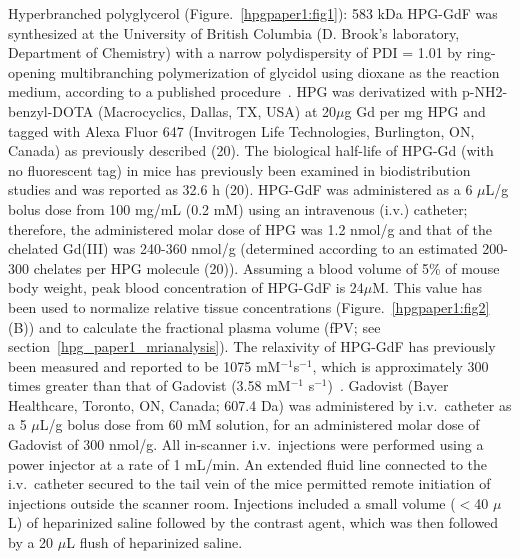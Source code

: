 Hyperbranched polyglycerol (Figure.~\ref{hpgpaper1:fig1}): 583 \acs{kDa} \acs{HPG-GdF} was synthesized at the University of British Columbia (D. Brook's laboratory, Department of Chemistry) with a narrow polydispersity of PDI = 1.01 by ring-opening multibranching polymerization of glycidol using dioxane as the reaction medium, according to a published procedure~\cite{Kainthan:2006ce}.
HPG was derivatized with p-NH2-benzyl-DOTA (Macrocyclics, Dallas, TX, USA) at 20$\mu$g Gd per mg HPG and tagged with Alexa Fluor 647 (Invitrogen Life Technologies, Burlington, ON, Canada) as previously described (20).
The biological half-life of HPG-Gd (with no fluorescent tag) in mice has previously been examined in biodistribution studies and was reported as 32.6 h (20).
HPG-GdF was administered as a 6 $\mu$L/g bolus dose from 100 mg/mL (0.2 mM) using an intravenous (i.v.) catheter; therefore, the administered molar dose of HPG was 1.2 nmol/g and that of the chelated Gd(III) was 240-360 nmol/g (determined according to an estimated 200-300 chelates per HPG molecule (20)).
Assuming a blood volume of 5\% of mouse body weight, peak blood concentration of \acs{HPG-GdF} is 24$\mu$M.
This value has been used to normalize relative tissue concentrations (Figure.~\ref{hpgpaper1:fig2}(B)) and to calculate the fractional plasma volume (\acs{fPV}; see section~\ref{hpg_paper1_mrianalysis}).
The relaxivity of \acs{HPG-GdF} has previously been measured and reported to be 1075 mM$^{-1}$s$^{-1}$, which is approximately 300 times greater than that of Gadovist (3.58 mM$^{-1}$ s$^{-1}$)~\cite{Saatchi:2012hc}.
Gadovist (Bayer Healthcare, Toronto, ON, Canada; 607.4 \acs{Da}) was administered by i.v.\ catheter as a 5 $\mu$L/g bolus dose from 60 mM solution, for an administered molar dose of Gadovist of 300 nmol/g.
All in-scanner i.v.\ injections were performed using a power injector at a rate of 1 mL/min.
An extended fluid line connected to the i.v.\ catheter secured to the tail vein of the mice permitted remote initiation of injections outside the scanner room.
Injections included a small volume ($<$40 $\mu$L) of heparinized saline followed by the contrast agent, which was then followed by a 20 $\mu$L flush of heparinized saline.

